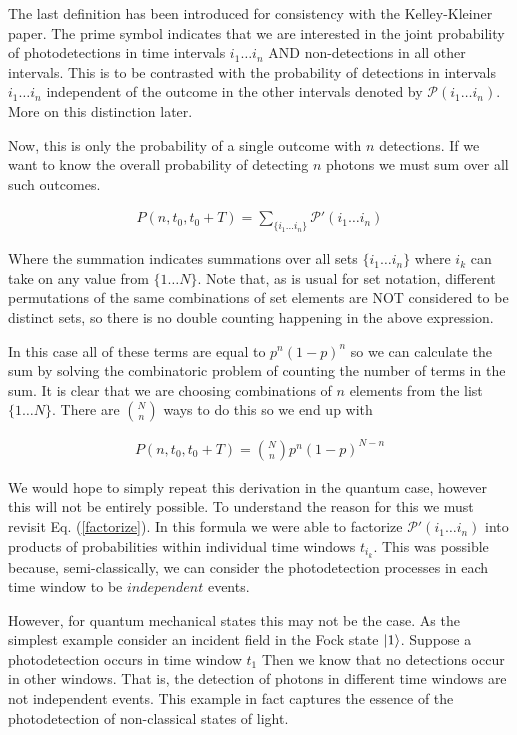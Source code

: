\documentclass[12pt]{article}
\begin{document}
The last definition has been introduced for consistency with the Kelley-Kleiner paper. The prime symbol indicates that we are interested in the joint probability of photodetections in time intervals $i_1 \ldots i_n$ AND non-detections in all other intervals. This is to be contrasted with the probability of detections in intervals $i_1 \ldots i_n$ independent of the outcome in the other intervals denoted by $\mathcal{P}(i_1 \ldots i_n)$. More on this distinction later.

Now, this is only the probability of a single outcome with $n$ detections. If we want to know the overall probability of detecting $n$ photons we must sum over all such outcomes.

\begin{align}
\label{nphoton}
P(n,t_0,t_0+T) = \sum_{\{i_1 \ldots i_n\}} \mathcal{P}'(i_1 \ldots i_n)
\end{align}

Where the summation indicates summations over all sets $\{i_1 \ldots i_n\}$ where $i_k$ can take on any value from $\{1 \ldots N\}$. Note that, as is usual for set notation, different permutations of the same combinations of set elements are NOT considered to be distinct sets, so there is no double counting happening in the above expression.

In this case all of these terms are equal to $p^n(1-p)^n$ so we can calculate the sum by solving the combinatoric problem of counting the number of terms in the sum. It is clear that we are choosing combinations of $n$ elements from the list $\{1 \ldots N\}$. There are $\binom{N}{n}$ ways to do this so we end up with

\begin{align}
P(n,t_0,t_0+T) = \binom{N}{n} p^n (1-p)^{N-n}
\end{align}

We would hope to simply repeat this derivation in the quantum case, however this will not be entirely possible. To understand the reason for this we must revisit Eq. (\ref{factorize}). In this formula we were able to factorize $\mathcal{P}'(i_1 \ldots i_n)$ into products of probabilities within individual time windows $t_{i_k}$. This was possible because, semi-classically, we can consider the photodetection processes in each time window to be $\textit{independent}$ events. 

However, for quantum mechanical states this may not be the case. As the simplest example consider an incident field in the Fock state $\ket{1}$. Suppose a photodetection occurs in time window $t_1$ Then we know that no detections occur in other windows. That is, the detection of photons in different time windows are not independent events. This example in fact captures the essence of the photodetection of non-classical states of light.
\end{document}
